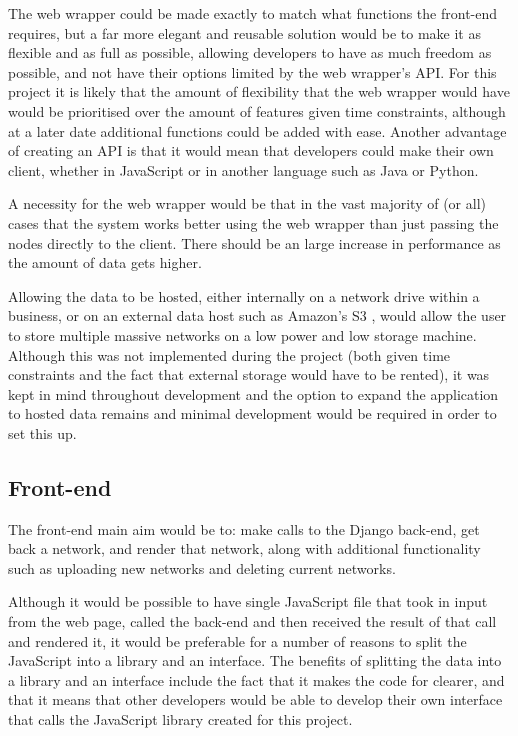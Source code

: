 \documentclass[../dissertation.tex]{subfiles}
\begin{document}
The web wrapper could be made exactly to match what functions the front-end requires, but a far more elegant and reusable solution would be to make it as flexible and as full as possible, allowing developers to have as much freedom as possible, and not have their options limited by the web wrapper's API. For this project it is likely that the amount of flexibility that the web wrapper would have would be prioritised over the amount of features given time constraints, although at a later date additional functions could be added with ease. Another advantage of creating an API is that it would mean that developers could make their own client, whether in JavaScript or in another language such as Java or Python.

A necessity for the web wrapper would be that in the vast majority of (or all) cases that the system works better using the web wrapper than just passing the nodes directly to the client. There should be an large increase in performance as the amount of data gets higher.

Allowing the data to be hosted, either internally on a network drive within a business, or on an external data host such as Amazon's S3 \cite{amazons3}, would allow the user to store multiple massive networks on a low power and low storage machine. Although this was not implemented during the project (both given time constraints and the fact that external storage would have to be rented), it was kept in mind throughout development and the option to expand the application to hosted data remains and minimal development would be required in order to set this up.

\subsection{Front-end}

The front-end main aim would be to: make calls to the Django back-end, get back a network, and render that network, along with additional functionality such as uploading new networks and deleting current networks. 

Although it would be possible to have single JavaScript file that took in input from the web page, called the back-end and then received the result of that call and rendered it, it would be preferable for a number of reasons to split the JavaScript into a library and an interface. The benefits of splitting the data into a library and an interface include the fact that it makes the code for clearer, and that it means that other developers would be able to develop their own interface that calls the JavaScript library created for this project.
\end{document}
